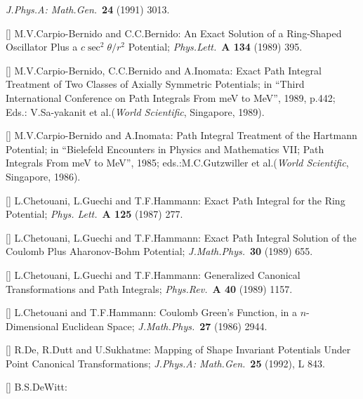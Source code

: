 {\it J.Phys.A: Math.Gen.}\ {\bf 24} (1991) 3013.
\item{[\CBB]}
M.V.Carpio-Bernido and C.C.Bernido:
An Exact Solution of a Ring-Shaped Oscillator Plus a
$c\sec^2\theta/r^2$ Potential;
{\it Phys.Lett.}\ {\bf A 134} (1989) 395.
\item{[\CBBI]}
M.V.Carpio-Bernido, C.C.Bernido and A.Inomata:
Exact Path Integral Treatment of Two Classes of Axially Symmetric
Potentials; in ``Third International Conference on
Path Integrals From meV to MeV'', 1989, p.442;
Eds.: V.Sa-yakanit et al.({\it World Scientific}, Singapore, 1989).
\item{[\CBI]}
M.V.Carpio-Bernido and A.Inomata:
Path Integral Treatment of the Hartmann Potential;
in ``Bielefeld Encounters in Physics and Mathematics VII; Path
Integrals From meV to MeV'', 1985;
eds.:M.C.Gutz\-willer et al.({\it World Scientific}, Singapore, 1986).
\item{[\CGHa]}
L.Chetouani, L.Guechi and T.F.Hammann:
Exact Path Integral for the Ring Potential;
{\it Phys. Lett.}\ {\bf A 125} (1987) 277.
\item{[\CGHc]}
L.Chetouani, L.Guechi and T.F.Hammann:
Exact Path Integral Solution of the Coulomb Plus Aharonov-Bohm
Potential;
{\it J.Math.Phys.}\ {\bf 30} (1989) 655.
\item{[\CGHd]}
L.Chetouani, L.Guechi and T.F.Hammann:
Generalized Canonical Transformations and Path Integrals;
{\it Phys.Rev.}\ {\bf A 40} (1989) 1157.
\item{[\CHc]}
L.Chetouani and T.F.Hammann:
Coulomb Green's Function, in a $n$-Dimensional Euclidean Space;
{\it J.Math.Phys.}\ {\bf 27} (1986) 2944.
\item{[\DDS]}
R.De, R.Dutt and U.Sukhatme:
Mapping of Shape Invariant Potentials Under Point Canonical
Transformations;
{\it J.Phys.A: Math.Gen.}\ {\bf 25} (1992), L 843.
\item{[\DEWb]}
B.S.DeWitt:
